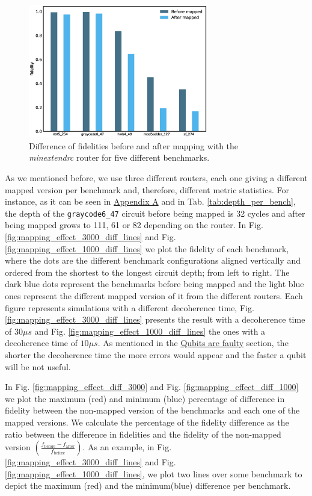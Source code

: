\begin{figure}[htbp]
\centering
\includegraphics[width=0.7\textwidth]{figures/f_diff_bar_plot.eps}
\caption{\label{fig:f_diff_bar_plot}
Difference of fidelities before and after mapping with the \emph{minextendrc} router for five different benchmarks.}
\end{figure}
As we mentioned before, we use three different routers, each one giving a different mapped version per benchmark and, therefore, different metric statistics.
For instance, as it can be seen in \href{appendix-1.org}{Appendix A} and in Tab. \ref{tab:depth_per_bench}, the depth of the \texttt{graycode6\_47} circuit before being mapped is 32 cycles and after being mapped grows to 111, 61 or 82 depending on the router.
In Fig. \ref{fig:mapping_effect_3000_diff_lines} and Fig. \ref{fig:mapping_effect_1000_diff_lines} we plot the fidelity of each benchmark, where the dots are the different benchmark configurations aligned vertically and ordered from the shortest to the longest circuit depth; from left to right.
The dark blue dots represent the benchmarks before being mapped and the light blue ones represent the different mapped version of it from the different routers.
Each figure represents simulations with a different decoherence time, Fig. \ref{fig:mapping_effect_3000_diff_lines} presents the result with a decoherence time of \(30 \mu s\) and Fig. \ref{fig:mapping_effect_1000_diff_lines} the ones with a decoherence time of \(10 \mu s\).
As mentioned in the \href{quantum_computing.org}{Qubits are faulty} section, the shorter the decoherence time the more errors would appear and the faster a qubit will be not useful.

In Fig. \ref{fig:mapping_effect_diff_3000} and Fig. \ref{fig:mapping_effect_diff_1000} we plot the maximum (red) and minimum (blue) percentage of difference in fidelity between the non-mapped version of the benchmarks and each one of the mapped versions.
We calculate the percentage of the fidelity difference as the ratio between the difference in fidelities and the fidelity of the non-mapped version \(\left(\frac{f_{\text{before}} - f_{\text{after}}}{f_{\text{before}}}\right)\).
As an example, in Fig. \ref{fig:mapping_effect_3000_diff_lines} and Fig. \ref{fig:mapping_effect_1000_diff_lines}, we plot two lines over some benchmark to depict the maximum (red) and the minimum(blue) difference per benchmark.

